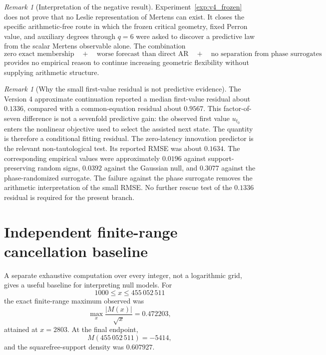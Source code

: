 \documentclass[11pt]{amsart}
\numberwithin{equation}{section}
\theoremstyle{plain}
\theoremstyle{definition}
\theoremstyle{remark}
\newtheorem{remark}[theorem]{Remark}
\begin{document}
\begin{remark}[Interpretation of the negative result]
\label{rem:v4_negative_interpretation}
Experiment~\ref{exp:v4_frozen} does not prove that no Leslie representation of Mertens can
exist.  It closes the specific arithmetic-free route in which the frozen critical geometry,
fixed Perron value, and auxiliary degrees through $q=6$ were asked to discover a predictive law
from the scalar Mertens observable alone.  The combination
\[
\text{zero exact membership}
\quad+\quad
\text{worse forecast than direct AR}
\quad+\quad
\text{no separation from phase surrogates}
\]
provides no empirical reason to continue increasing geometric flexibility without supplying
arithmetic structure.
\end{remark}

\begin{remark}[Why the small first-value residual is not predictive evidence]
\label{rem:first_value_residual_contamination}
The Version 4 approximate continuation reported a median first-value residual about $0.1336$,
compared with a common-equation residual about $0.9567$.  This factor-of-seven difference is not
a sevenfold predictive gain: the observed first value $u_{t_0}$ enters the nonlinear objective
used to select the assisted next state.  The quantity is therefore a conditional fitting
residual.  The zero-latency innovation predictor is the relevant non-tautological test.  Its
reported RMSE was about $0.1634$.  The corresponding empirical values were approximately
$0.0196$ against support-preserving random signs, $0.0392$ against the Gaussian null, and
$0.3077$ against the phase-randomized surrogate.  The failure against the phase surrogate removes
the arithmetic interpretation of the small RMSE.  No further rescue test of the $0.1336$ residual
is required for the present branch.
\end{remark}


\section{Independent finite-range cancellation baseline}
\label{sec:finite_range_envelope}

A separate exhaustive computation over every integer, not a logarithmic grid, gives a useful
baseline for interpreting null models.  For
\[
1000\le x\le455\,052\,511
\]
the exact finite-range maximum observed was
\begin{equation}
\max_x\frac{|M(x)|}{\sqrt x}
=
0.472203,
\label{eq:finite_C_mu}
\end{equation}
attained at $x=2803$.  At the final endpoint,
\[
M(455\,052\,511)=-5414,
\]
and the squarefree-support density was $0.607927$.
\end{document}
